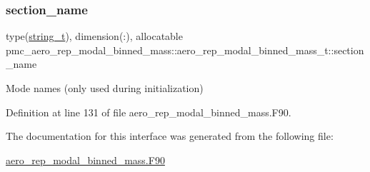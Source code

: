 \subsubsection{\texorpdfstring{section\+\_\+name}{section\_name}}
{\footnotesize\ttfamily type(\mbox{\hyperlink{structpmc__util_1_1string__t}{string\+\_\+t}}), dimension(\+:), allocatable pmc\+\_\+aero\+\_\+rep\+\_\+modal\+\_\+binned\+\_\+mass\+::aero\+\_\+rep\+\_\+modal\+\_\+binned\+\_\+mass\+\_\+t\+::section\+\_\+name\hspace{0.3cm}{\ttfamily [private]}}



Mode names (only used during initialization) 



Definition at line 131 of file aero\+\_\+rep\+\_\+modal\+\_\+binned\+\_\+mass.\+F90.



The documentation for this interface was generated from the following file\+:\begin{DoxyCompactItemize}
\item 
\mbox{\hyperlink{aero__rep__modal__binned__mass_8_f90}{aero\+\_\+rep\+\_\+modal\+\_\+binned\+\_\+mass.\+F90}}\end{DoxyCompactItemize}

